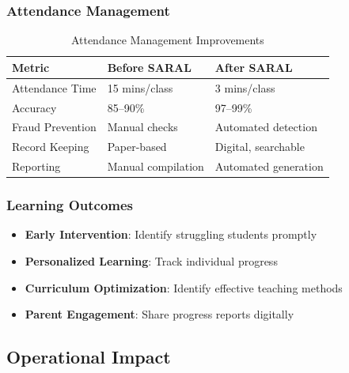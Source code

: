 \documentclass[12pt,a4paper]{article}
\newcommand{\important}[1]{\textbf{\textcolor{accent}{#1}}}
\begin{document}
\subsubsection{Attendance Management}
\begin{table}[H]
\centering
\small
\begin{tabularx}{\textwidth}{|l|X|X|}
\hline
\rowcolor{lightgray}
\textbf{Metric} & \textbf{Before SARAL} & \textbf{After SARAL} \\
\hline
Attendance Time & 15 mins/class & 3 mins/class \\
\hline
Accuracy & 85--90\% & 97--99\% \\
\hline
Fraud Prevention & Manual checks & Automated detection \\
\hline
Record Keeping & Paper-based & Digital, searchable \\
\hline
Reporting & Manual compilation & Automated generation \\
\hline
\end{tabularx}
\caption{Attendance Management Improvements}
\end{table}

\subsubsection{Learning Outcomes}
\begin{itemize}[leftmargin=*, itemsep=0.2em]
    \item \important{Early Intervention}: Identify struggling students promptly
    \item \important{Personalized Learning}: Track individual progress
    \item \important{Curriculum Optimization}: Identify effective teaching methods
    \item \important{Parent Engagement}: Share progress reports digitally
\end{itemize}

\subsection{Operational Impact}
\end{document}
